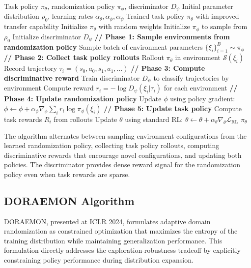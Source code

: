 \begin{algorithm}[htbp]
\caption{Active Domain Randomization}
\label{alg:adr}
\begin{algorithmic}[1]
\Require Task policy $\pi_\theta$, randomization policy $\pi_\phi$, discriminator $D_\psi$
\Require Initial parameter distribution $\rho_0$, learning rates $\alpha_\theta, \alpha_\phi, \alpha_\psi$
\Ensure Trained task policy $\pi_\theta$ with improved transfer capability
\State Initialize $\pi_\theta$ with random weights
\State Initialize $\pi_\phi$ to sample from $\rho_0$
\State Initialize discriminator $D_\psi$
    \State \textbf{// Phase 1: Sample environments from randomization policy}
    \State Sample batch of environment parameters $\{\xi_i\}_{i=1}^B \sim \pi_\phi$
    \State \textbf{// Phase 2: Collect task policy rollouts}
        \State Rollout $\pi_\theta$ in environment $\mathcal{S}(\xi_i)$
        \State Record trajectory $\tau_i = (s_0, a_0, s_1, a_1, \ldots)$
    \EndFor
    \State \textbf{// Phase 3: Compute discriminative reward}
    \State Train discriminator $D_\psi$ to classify trajectories by environment
    \State Compute reward $r_i = -\log D_\psi(\xi_i | \tau_i)$ for each environment
    \State \textbf{// Phase 4: Update randomization policy}
    \State Update $\phi$ using policy gradient: $\phi \leftarrow \phi + \alpha_\phi \nabla_\phi \sum_i r_i \log \pi_\phi(\xi_i)$
    \State \textbf{// Phase 5: Update task policy}
    \State Compute task rewards $R_i$ from rollouts
    \State Update $\theta$ using standard RL: $\theta \leftarrow \theta + \alpha_\theta \nabla_\theta \mathcal{L}_{\text{RL}}$
\EndFor
\State \Return $\pi_\theta$
\end{algorithmic}
\end{algorithm}

The algorithm alternates between sampling environment configurations from the learned randomization policy, collecting task policy rollouts, computing discriminative rewards that encourage novel configurations, and updating both policies. The discriminator provides dense reward signal for the randomization policy even when task rewards are sparse.

\subsection{DORAEMON Algorithm}

DORAEMON, presented at ICLR 2024, formulates adaptive domain randomization as constrained optimization that maximizes the entropy of the training distribution while maintaining generalization performance. This formulation directly addresses the exploration-robustness tradeoff by explicitly constraining policy performance during distribution expansion.

